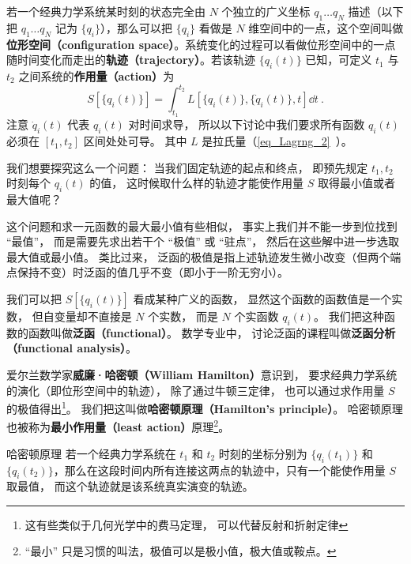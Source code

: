 

若一个经典力学系统某时刻的状态完全由 $N$ 个独立的广义坐标 $q_1\dots q_N$ 描述（以下把 $q_1\dots q_N$ 记为 $\{q_i\}$），那么可以把 $\{q_i\}$ 看做是 $N$ 维空间中的一点，这个空间叫做\textbf{位形空间（configuration space）}。系统变化的过程可以看做位形空间中的一点随时间变化而走出的\textbf{轨迹（trajectory）}。若该轨迹 $\{ {{q_i}(t)} \}$ 已知，可定义 $t_1$ 与 $t_2$ 之间系统的\textbf{作用量（action）}为
\begin{equation}\label{eq_HamPrn_1}
S[\{q_i(t)\}] = \int_{t_1}^{t_2} L[\{q_i(t)\}, \{\dot q_i(t)\}, t] \dd{t}~.
\end{equation}
注意 $\dot q_i(t)$ 代表 $q_i(t)$ 对时间求导， 所以以下讨论中我们要求所有函数 $q_i(t)$ 必须在 $[t_1, t_2]$ 区间处处可导。 其中 $L$ 是拉氏量（\autoref{eq_Lagrng_2}~）。

我们想要探究这么一个问题： 当我们固定轨迹的起点和终点， 即预先规定 $t_1, t_2$ 时刻每个 $q_i(t)$ 的值， 这时候取什么样的轨迹才能使作用量 $S$ 取得最小值或者最大值呢？

这个问题和求一元函数的最大最小值有些相似， 事实上我们并不能一步到位找到 “最值”， 而是需要先求出若干个 “极值” 或 “驻点”， 然后在这些解中进一步选取最大值或最小值。 类比过来， 泛函的极值是指上述轨迹发生微小改变（但两个端点保持不变）时泛函的值几乎不变（即小于一阶无穷小）。

我们可以把 $S[\{q_i(t)\}]$ 看成某种广义的函数， 显然这个函数的函数值是一个实数， 但自变量却不直接是 $N$ 个实数， 而是 $N$ 个实函数 $q_i(t)$。 我们把这种函数的函数叫做\textbf{泛函（functional）}。%
数学专业中， 讨论泛函的课程叫做\textbf{泛函分析（functional analysis）}。

爱尔兰数学家\textbf{威廉·哈密顿（William Hamilton）}意识到， 要求经典力学系统的演化（即位形空间中的轨迹）， 除了通过牛顿三定律， 也可以通过求作用量 $S$ 的极值得出\footnote{这有些类似于几何光学中的费马定理， 可以代替反射和折射定律}。 我们把这叫做\textbf{哈密顿原理（Hamilton's principle）}。 哈密顿原理也被称为\textbf{最小作用量（least action）}原理\footnote{“最小” 只是习惯的叫法，极值可以是极小值，极大值或鞍点。}。%

\begin{theorem}{哈密顿原理}
若一个经典力学系统在 $t_1$ 和 $t_2$ 时刻的坐标分别为 $\{q_i(t_1)\}$ 和 $\{q_i(t_2)\}$，那么在这段时间内所有连接这两点的轨迹中，只有一个能使作用量 $S$ 取最值， 而这个轨迹就是该系统真实演变的轨迹。
\end{theorem}

